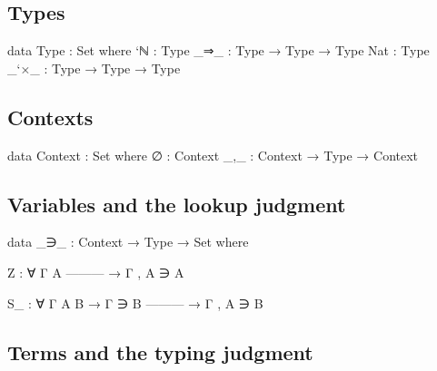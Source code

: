 \hypertarget{types}{%
\subsection{Types}\label{types}}

\begin{fence}
\begin{code}
data Type : Set where
  `ℕ    : Type
  _⇒_   : Type → Type → Type
  Nat   : Type
  _`×_  : Type → Type → Type
\end{code}
\end{fence}

\hypertarget{contexts}{%
\subsection{Contexts}\label{contexts}}

\begin{fence}
\begin{code}
data Context : Set where
  ∅   : Context
  _,_ : Context → Type → Context
\end{code}
\end{fence}

\hypertarget{variables-and-the-lookup-judgment}{%
\subsection{Variables and the lookup
judgment}\label{variables-and-the-lookup-judgment}}

\begin{fence}
\begin{code}
data _∋_ : Context → Type → Set where

  Z : ∀ {Γ A}
      ---------
    → Γ , A ∋ A

  S_ : ∀ {Γ A B}
    → Γ ∋ B
      ---------
    → Γ , A ∋ B
\end{code}
\end{fence}

\hypertarget{terms-and-the-typing-judgment}{%
\subsection{Terms and the typing
judgment}\label{terms-and-the-typing-judgment}}

